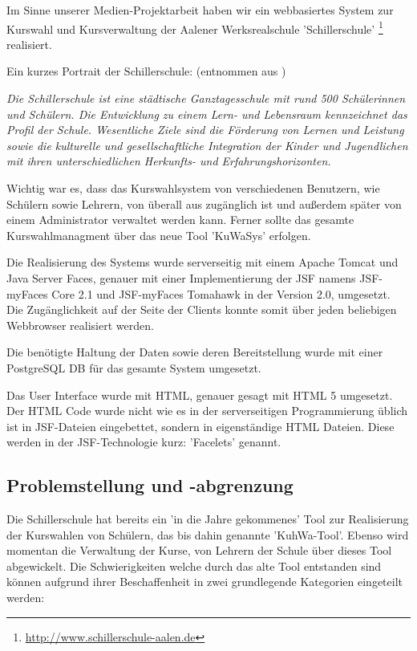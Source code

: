 \documentclass[12pt, twoside, a4paper, ngerman]{article}
\newcommand{\iz}[2]{#1 {\renewcommand{\baselinestretch}{1}\footnote{#2}}} %
\renewcommand{\baselinestretch}{1.5}
\begin{document}
Im Sinne unserer Medien-Projektarbeit haben wir ein webbasiertes System zur Kurswahl und Kursverwaltung der Aalener Werksrealschule \iz{'Schillerschule'}{\url{http://www.schillerschule-aalen.de}} realisiert.

Ein kurzes Portrait der Schillerschule: (entnommen aus \cite{Sch-Po})

\begin{center}
\textit{
\grqq Die Schillerschule ist eine städtische Ganztagesschule mit rund 500 Schülerinnen und Schülern. Die Entwicklung zu einem Lern- und Lebensraum kennzeichnet das Profil der Schule. Wesentliche Ziele sind die Förderung von Lernen und Leistung sowie die kulturelle und gesellschaftliche Integration der Kinder und Jugendlichen mit ihren unterschiedlichen Herkunfts- und Erfahrungshorizonten.\glqq}
\end{center}

Wichtig war es, dass das Kurswahlsystem von verschiedenen Benutzern, wie Schülern sowie Lehrern, von überall aus zugänglich ist und außerdem später von einem Administrator verwaltet werden kann. Ferner sollte das gesamte Kurswahlmanagment über das neue Tool 'KuWaSys' erfolgen.

Die Realisierung des Systems wurde serverseitig mit einem \gls{Apache Tomcat} und \gls{Java Server Faces}, genauer mit einer Implementierung der \ac{JSF} namens \gls{JSF-myFaces Core} 2.1 und \gls{JSF-myFaces Tomahawk} in der Version 2.0, umgesetzt.
Die Zugänglichkeit auf der Seite der Clients konnte somit über jeden beliebigen Webbrowser realisiert werden.

Die benötigte Haltung der Daten sowie deren Bereitstellung wurde mit einer PostgreSQL \ac{DB} für das gesamte System umgesetzt.

Das \gls{User Interface} wurde mit \gls{HTML}, genauer gesagt mit HTML 5 umgesetzt. Der HTML Code wurde nicht wie es in der serverseitigen Programmierung üblich ist in \ac{JSF}-Dateien eingebettet, sondern in eigenständige HTML Dateien.
Diese werden in der \ac{JSF}-Technologie kurz: 'Facelets' genannt.

\subsection{Problemstellung und -abgrenzung}\label{subsec:Problemstellung und -abgrenzung}

Die Schillerschule hat bereits ein 'in die Jahre gekommenes' Tool zur Realisierung der Kurswahlen von Schülern, das bis dahin genannte 'KuhWa-Tool'. Ebenso wird momentan die Verwaltung der Kurse, von Lehrern der Schule über dieses Tool abgewickelt.
Die Schwierigkeiten welche durch das alte Tool entstanden sind können aufgrund ihrer Beschaffenheit in zwei grundlegende Kategorien eingeteilt werden:
\end{document}
